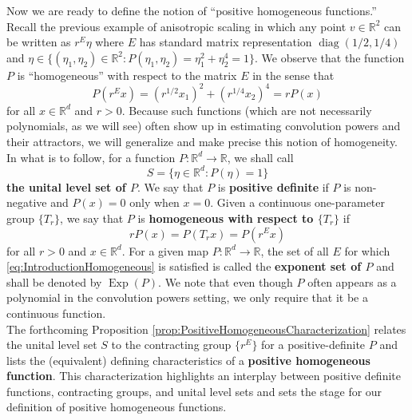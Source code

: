 \documentclass[11pt, letter]{book}
\newcommand\Exp{\operatorname{Exp}}
\newcommand\diag{\operatorname{diag}}
\newcommand{\lp}{\left(}
\newcommand{\rp}{\right)}
\begin{document}

\noindent Now we are ready to define the notion of ``positive homogeneous functions.'' Recall the previous example of anisotropic scaling in which any point $v\in \mathbb{R}^2$ can be written as $r^{E}\eta$ where $E$ has standard matrix representation $\diag(1/2,1/4)$ and $\eta \in \{ (\eta_1,\eta_2) \in \mathbb{R}^2 : P(\eta_1, \eta_2) ={\eta}_1^{2} + {\eta}_2^{4} = 1  \}$. We observe that the function $P$ is ``homogeneous'' with respect to the matrix $E$ in the sense that 
\begin{equation*}
    P(r^{E}x) =  \lp r^{1/2}{x}_1\rp ^{2} + \lp r^{1/4}{x}_2\rp ^{4} = r P(x)
\end{equation*}
for all $x\in \mathbb{R}^d$ and $r>0$. Because such functions (which are not necessarily polynomials, as we will see) often show up in estimating convolution powers and their attractors, we will generalize and make precise this notion of homogeneity. In what is to follow, for a function $P:\mathbb{R}^d\to\mathbb{R}$, we shall call
\begin{equation*}
    S=\{\eta\in\mathbb{R}^d:P(\eta)=1\}
\end{equation*}
\textbf{the unital level set of $P$}. We say that $P$ is \textbf{positive definite} if $P$ is non-negative and $P(x)=0$ only when $x=0$. Given a continuous one-parameter group $\{T_r\}$, we say that $P$ is \textbf{homogeneous with respect to $\{T_r\}$} if
\begin{equation}\label{eq:IntroductionHomogeneous}
    rP(x)=P(T_r x)=P(r^Ex)
\end{equation}
for all $r>0$ and $x\in\mathbb{R}^d$. For a given map $P:\mathbb{R}^d\to\mathbb{R}$, the set of all $E$ for which \eqref{eq:IntroductionHomogeneous} is satisfied is called the \textbf{exponent set of $P$} and shall be denoted by $\Exp(P)$. We note that even though $P$ often appears as a polynomial in the convolution powers setting, we only require that it be a continuous function. \\



The forthcoming Proposition \ref{prop:PositiveHomogeneousCharacterization} relates the unital level set $S$ to the contracting group $\{r^E\}$ for a positive-definite $P$ and lists the (equivalent) defining characteristics of a \textbf{positive homogeneous function}. This characterization highlights an interplay between positive definite functions, contracting groups, and unital level sets and sets the stage for our definition of positive homogeneous functions.\\
\end{document}

